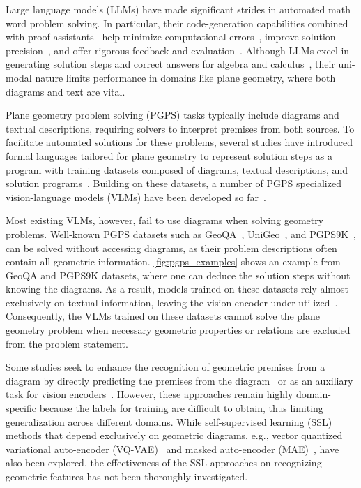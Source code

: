 Large language models (LLMs) have made significant strides in automated math word problem solving. In particular, their code-generation capabilities combined with proof assistants~\citep{lean,isabelle} help minimize computational errors~\citep{POT}, improve solution precision~\citep{autoformalization}, and offer rigorous feedback and evaluation~\citep{MATH}. Although LLMs excel in generating solution steps and correct answers for algebra and calculus~\citep{math_solving}, their uni-modal nature limits performance in domains like plane geometry, where both diagrams and text are vital.

Plane geometry problem solving (PGPS) tasks typically include diagrams and textual descriptions, requiring solvers to interpret premises from both sources. To facilitate automated solutions for these problems, several studies have introduced formal languages tailored for plane geometry to represent solution steps as a program with training datasets composed of diagrams, textual descriptions, and solution programs~\citep{geoqa,unigeo,intergps,pgps}. Building on these datasets, a number of PGPS specialized vision-language models (VLMs) have been developed so far~\citep{GOLD, LANS, geox}.

Most existing VLMs, however, fail to use diagrams when solving geometry problems. Well-known PGPS datasets such as GeoQA~\citep{geoqa}, UniGeo~\citep{unigeo}, and PGPS9K~\citep{pgps}, can be solved without accessing diagrams, as their problem descriptions often contain all geometric information. \cref{fig:pgps_examples} shows an example from GeoQA and PGPS9K datasets, where one can deduce the solution steps without knowing the diagrams. 
As a result, models trained on these datasets rely almost exclusively on textual information, leaving the vision encoder under-utilized~\citep{GOLD}. 
Consequently, the VLMs trained on these datasets cannot solve the plane geometry problem when necessary geometric properties or relations are excluded from the problem statement.

Some studies seek to enhance the recognition of geometric premises from a diagram by directly predicting the premises from the diagram~\citep{GOLD, intergps} or as an auxiliary task for vision encoders~\citep{geoqa,geoqa-plus}. However, these approaches remain highly domain-specific because the labels for training are difficult to obtain, thus limiting generalization across different domains. While self-supervised learning (SSL) methods that depend exclusively on geometric diagrams, e.g., vector quantized variational auto-encoder (VQ-VAE)~\citep{unimath} and masked auto-encoder (MAE)~\citep{scagps,geox}, have also been explored, the effectiveness of the SSL approaches on recognizing geometric features has not been thoroughly investigated.

